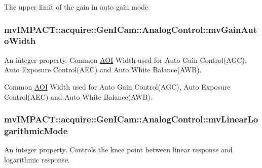 The upper limit of the gain in auto gain mode \hypertarget{classmv_i_m_p_a_c_t_1_1acquire_1_1_gen_i_cam_1_1_analog_control_a8aa92ebc6e7feade0b09bb05c37e67ea}{
\subsubsection[{mv\+Gain\+Auto\+Width}]{ mv\+I\+M\+P\+A\+C\+T\+::acquire\+::\+Gen\+I\+Cam\+::\+Analog\+Control\+::mv\+Gain\+Auto\+Width}}\label{classmv_i_m_p_a_c_t_1_1acquire_1_1_gen_i_cam_1_1_analog_control_a8aa92ebc6e7feade0b09bb05c37e67ea}


An integer property. Common \hyperlink{struct_a_o_i}{A\+O\+I} Width used for Auto Gain Control(\+A\+G\+C), Auto Exposure Control(\+A\+E\+C) and Auto White Balance(\+A\+W\+B). 

Common \hyperlink{struct_a_o_i}{A\+O\+I} Width used for Auto Gain Control(\+A\+G\+C), Auto Exposure Control(\+A\+E\+C) and Auto White Balance(\+A\+W\+B). \hypertarget{classmv_i_m_p_a_c_t_1_1acquire_1_1_gen_i_cam_1_1_analog_control_ae88723ad284d25b43d01e9e538889b6c}{
\subsubsection[{mv\+Linear\+Logarithmic\+Mode}]{ mv\+I\+M\+P\+A\+C\+T\+::acquire\+::\+Gen\+I\+Cam\+::\+Analog\+Control\+::mv\+Linear\+Logarithmic\+Mode}}\label{classmv_i_m_p_a_c_t_1_1acquire_1_1_gen_i_cam_1_1_analog_control_ae88723ad284d25b43d01e9e538889b6c}


An integer property. Controls the knee point between linear response and logarithmic response. 

